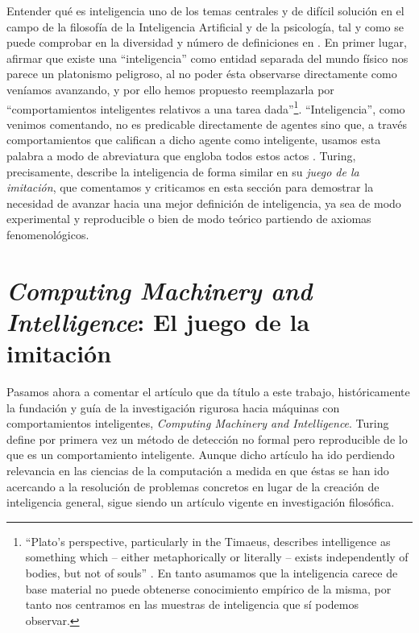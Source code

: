 \documentclass[12pt]{memoir}
\begin{document}
Entender qué es inteligencia uno de los temas centrales y de difícil solución en el campo de la filosofía de la Inteligencia Artificial y de la psicología, tal y como se puede comprobar en la diversidad y número de definiciones en \parencite{intDefs}. En primer lugar, afirmar que existe una ``inteligencia'' como entidad separada del mundo físico nos parece un platonismo peligroso, al no poder ésta observarse directamente como veníamos avanzando, y por ello hemos propuesto reemplazarla por ``comportamientos inteligentes relativos a una tarea dada''\footnote{``Plato’s perspective, particularly in the Timaeus, describes intelligence as something which – either metaphorically or literally – exists independently of bodies, but not of souls'' \parencite{embodyingCognition}. En tanto asumamos que la inteligencia carece de base material no puede obtenerse conocimiento empírico de la misma, por tanto nos centramos en las muestras de inteligencia que sí podemos observar.}. ``Inteligencia'', como venimos comentando, no es predicable directamente de agentes sino que, a través comportamientos que califican a dicho agente como inteligente, usamos esta palabra a modo de abreviatura que engloba todos estos actos \parencite{diamantAdvancesAI}. Turing, precisamente, describe la inteligencia de forma similar en su \textit{juego de la imitación}, que comentamos y criticamos en esta sección para demostrar la necesidad de avanzar hacia una mejor definición de inteligencia, ya sea de modo experimental y reproducible o bien de modo teórico partiendo de axiomas fenomenológicos.

\section[\textit{Computing Machinery and Intelligence}: El juego de la imitación]{\textit{Computing Machinery and Intelligence}: El juego de la imitación}
\label{computingmachineryandintelligence}

Pasamos ahora a comentar el artículo que da título a este trabajo, históricamente la fundación y guía \parencite{turingHarmful} de la investigación rigurosa hacia máquinas con comportamientos inteligentes, \textit{Computing Machinery and Intelligence}. Turing define por primera vez un método de detección no formal pero reproducible de lo que es un comportamiento inteligente. Aunque dicho artículo ha ido perdiendo relevancia en las ciencias de la computación a medida en que éstas se han ido acercando a la resolución de problemas concretos en lugar de la creación de inteligencia general, sigue siendo un artículo vigente en investigación filosófica.
\end{document}
